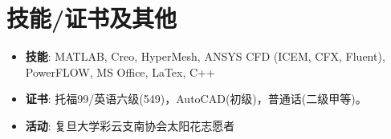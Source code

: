 \documentclass{resume}
\begin{document}
\section[其他]{技能/证书及其他}
\begin{itemize}
  \item \textbf{技能}: MATLAB, Creo, HyperMesh, ANSYS CFD (ICEM, CFX, Fluent), PowerFLOW, MS Office, LaTex, C++
  \item \textbf{证书}: 托福99/英语六级(549)，AutoCAD(初级)，普通话(二级甲等)。
  \item \textbf{活动}: 复旦大学彩云支南协会太阳花志愿者 
\end{itemize}
\end{document}
